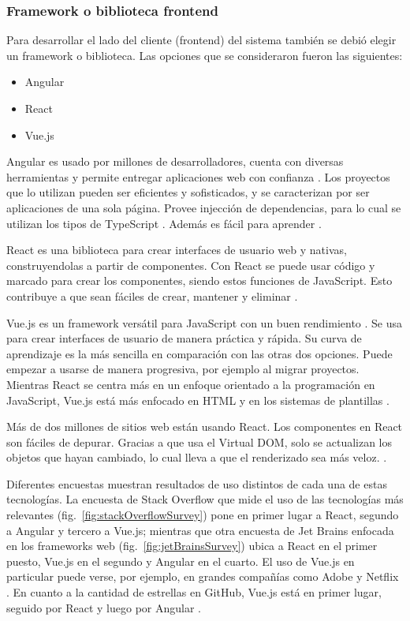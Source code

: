 \documentclass[twoside]{article}
\begin{document}
\subsubsection{Framework o biblioteca frontend}
Para desarrollar el lado del cliente (frontend) del sistema también se debió elegir un framework o biblioteca. Las opciones que se consideraron fueron las siguientes:
\begin{itemize}
    \item Angular
    \item React
    \item Vue.js
\end{itemize}
 Angular es usado por millones de desarrolladores, cuenta con diversas herramientas y permite entregar aplicaciones web con confianza \parencite{angularHome}. Los proyectos que lo utilizan pueden ser eficientes y sofisticados, y se caracterizan por ser aplicaciones de una sola página. Provee injección de dependencias, para lo cual se utilizan los tipos de TypeScript \parencite{angularDocsIntroduction}. Además es fácil para aprender \parencite{w3schoolsAngular}. 

 React es una biblioteca para crear interfaces de usuario web y nativas, construyendolas a partir de componentes. Con React se puede usar código y marcado para crear los componentes, siendo estos funciones de JavaScript. Esto contribuye a que sean fáciles de crear, mantener y eliminar \parencite{reactOfficialHome}.

 Vue.js es un framework versátil para JavaScript con un buen rendimiento \parencite{vueOfficialHome}. Se usa para crear interfaces de usuario de manera práctica y rápida. Su curva de aprendizaje es la más sencilla en comparación con las otras dos opciones. Puede empezar a usarse de manera progresiva, por ejemplo al migrar proyectos. Mientras React se centra más en un enfoque orientado a la programación en JavaScript, Vue.js está más enfocado en HTML y en los sistemas de plantillas \parencite{manz}.

Más de dos millones de sitios web están usando React. Los componentes en React son fáciles de depurar. Gracias a que usa el Virtual DOM, solo se actualizan los objetos que hayan cambiado, lo cual lleva a que el renderizado sea más veloz.  \parencite{galikReact}.

Diferentes encuestas muestran resultados de uso distintos de cada una de estas tecnologías. La encuesta de Stack Overflow que mide el uso de las tecnologías más relevantes (fig.~\ref{fig:stackOverflowSurvey}) pone en primer lugar a React, segundo a Angular y tercero a Vue.js; mientras que otra encuesta de Jet Brains enfocada en los frameworks web (fig.~\ref{fig:jetBrainsSurvey}) ubica a React en el primer puesto, Vue.js en el segundo y Angular en el cuarto. El uso de Vue.js en particular puede verse, por ejemplo, en grandes compañías como Adobe y Netflix \parencite{scalablepathVue}. En cuanto a la cantidad de estrellas en GitHub, Vue.js está en primer lugar, seguido por React y luego por Angular \parencite{codeinwp}.
\end{document}
